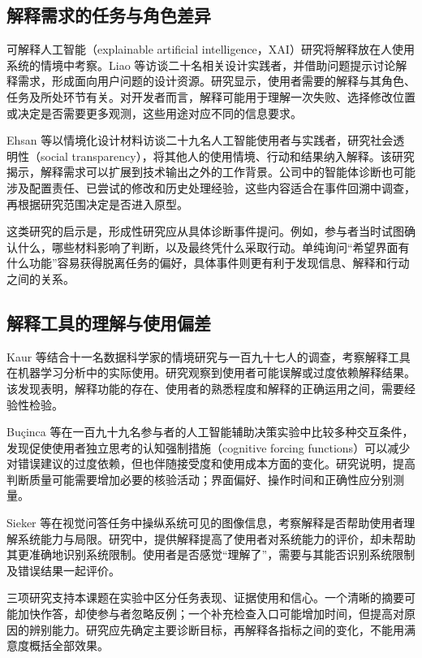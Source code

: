 \subsection{解释需求的任务与角色差异}

可解释人工智能（explainable artificial intelligence，XAI）研究将解释放在人使用系统的情境中考察。Liao 等\cite{ref49}访谈二十名相关设计实践者，并借助问题提示讨论解释需求，形成面向用户问题的设计资源。研究显示，使用者需要的解释与其角色、任务及所处环节有关。对开发者而言，解释可能用于理解一次失败、选择修改位置或决定是否需要更多观测，这些用途对应不同的信息要求。

Ehsan 等\cite{ref51}以情境化设计材料访谈二十九名人工智能使用者与实践者，研究社会透明性（social transparency），将其他人的使用情境、行动和结果纳入解释。该研究揭示，解释需求可以扩展到技术输出之外的工作背景。公司中的智能体诊断也可能涉及配置责任、已尝试的修改和历史处理经验，这些内容适合在事件回溯中调查，再根据研究范围决定是否进入原型。

这类研究的启示是，形成性研究应从具体诊断事件提问。例如，参与者当时试图确认什么，哪些材料影响了判断，以及最终凭什么采取行动。单纯询问“希望界面有什么功能”容易获得脱离任务的偏好，具体事件则更有利于发现信息、解释和行动之间的关系。

\subsection{解释工具的理解与使用偏差}

Kaur 等\cite{ref50}结合十一名数据科学家的情境研究与一百九十七人的调查，考察解释工具在机器学习分析中的实际使用。研究观察到使用者可能误解或过度依赖解释结果。该发现表明，解释功能的存在、使用者的熟悉程度和解释的正确运用之间，需要经验性检验。

Buçinca 等\cite{ref55}在一百九十九名参与者的人工智能辅助决策实验中比较多种交互条件，发现促使使用者独立思考的认知强制措施（cognitive forcing functions）可以减少对错误建议的过度依赖，但也伴随接受度和使用成本方面的变化。研究说明，提高判断质量可能需要增加必要的核验活动；界面偏好、操作时间和正确性应分别测量。

Sieker 等\cite{ref56}在视觉问答任务中操纵系统可见的图像信息，考察解释是否帮助使用者理解系统能力与局限。研究中，提供解释提高了使用者对系统能力的评价，却未帮助其更准确地识别系统限制。使用者是否感觉“理解了”，需要与其能否识别系统限制及错误结果一起评价。

三项研究支持本课题在实验中区分任务表现、证据使用和信心。一个清晰的摘要可能加快作答，却使参与者忽略反例；一个补充检查入口可能增加时间，但提高对原因的辨别能力。研究应先确定主要诊断目标，再解释各指标之间的变化，不能用满意度概括全部效果。

